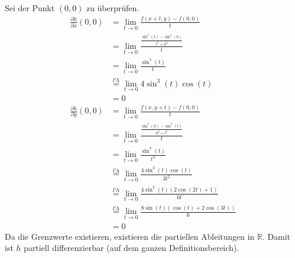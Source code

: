\documentclass[10pt,a4paper,parskip=half]{scrartcl}
\begin{document}
Sei der Punkt $(0,0)$ zu überprüfen. 
\begin{align*}
\frac{\partial h}{\partial x}(0,0) &=  \lim_{t \to 0} \frac{f(x +t,y) - f(0,0)}{t} \\
&=  \lim_{t \to 0} \frac{\frac{\sin^4(t) - \sin^4(0)}{t^2 + 0^4}}{t} \\
&= \lim_{t \to 0} \frac{\sin^4(t)}{t} \\
&\stackrel{l'h}{=}   \lim_{t \to 0} 4\sin^3(t)\cos(t) \\
&=0 \\
\frac{\partial h}{\partial y}(0,0) &= \lim_{t \to 0} \frac{f(x,y+t) - f(0,0)}{t} \\
&=  \lim_{t \to 0} \frac{\frac{\sin^4(0) - \sin^4(t)}{0^2 + t^4}}{t} \\
&=  \lim_{t \to 0} \frac{\sin^4(t)}{t^3} \\
&\stackrel{l'h}{=}   \lim_{t \to 0} \frac{ 4\sin^3(t)\cos(t)}{3t^2} \\
&\stackrel{l'h}{=}   \lim_{t \to 0} \frac{ 4\sin^2(t)(2\cos(2t)+1)}{6t} \\
&\stackrel{l'h}{=}   \lim_{t \to 0} \frac{ 8\sin(t)(\cos(t)+2\cos(3t))}{6} \\
&= 0
\end{align*}
Da die Grenzwerte existieren, existieren die partiellen Ableitungen in $\mathbb{R}$. Damit ist $h$ partiell differenzierbar (auf dem ganzen Definitionsbereich).
\end{document}
